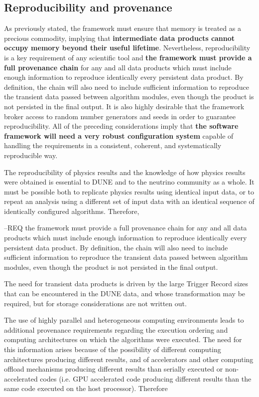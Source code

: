 \documentclass[../main-v1.tex]{subfiles}
\begin{document}
\subsection{Reproducibility and provenance} %
As previously stated, the framework must ensure that memory is treated as a precious commodity, implying that {\bf intermediate data products cannot occupy memory beyond their useful lifetime}.  Nevertheless, reproducibility is a key requirement of any scientific tool and {\bf the framework must provide a full provenance chain} for any and all data products which must include enough information to reproduce identically every persistent data product. By definition, the chain will also need to include sufficient information to reproduce the transient data passed between algorithm modules, even though the product is not persisted in the final output.
It is also highly desirable that the framework broker access to random number generators and seeds in order to guarantee reproducibility.  All of the preceding considerations imply that {\bf the software framework will need a very robust configuration system} capable of handling the requirements in a consistent, coherent, and systematically reproducible way.


The reproducibility of physics results and the knowledge of how physics results were obtained is essential to DUNE and to the neutrino community as a whole.  It must be possible both to replicate physics results using identical input data, or to repeat an analysis using a different set of input data with an identical sequence of identically configured algorithms.  Therefore, 

--REQ the framework must provide a full provenance chain for any and all data products which must include enough information to reproduce identically every persistent data product.  By definition, the chain will also need to include sufficient information to reproduce the transient data passed between algorithm modules, even though the product is not persisted in the final output.  

The need for transient data products is driven by the large Trigger Record sizes that can be encountered in the DUNE data, and whose transformation may be required, but for storage considerations are not written out.

The use of highly parallel and heterogeneous computing environments leads to additional provenance requirements regarding the execution ordering and computing architectures on which the algorithms were executed.  The need for this information arises because of the possibility of different computing architectures producing different results, and of accelerators and other computing offload mechanisms producing different results than serially executed or non-accelerated codes (i.e. GPU accelerated code producing different results than the same code executed on the host processor).  Therefore 
\end{document}
